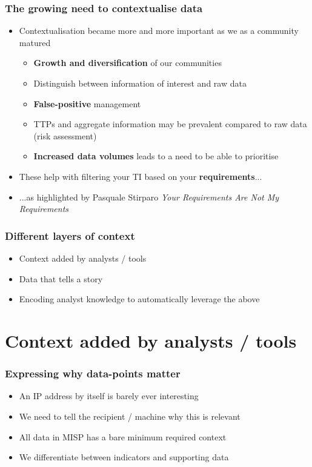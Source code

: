 \begin{frame}
\frametitle{The growing need to contextualise data}
\begin{itemize}
       \item Contextualisation became more and more important as we as a community matured
        \begin{itemize}
                \item {\bf Growth and diversification} of our communities
                \item Distinguish between information of interest and raw data
                \item {\bf False-positive} management
                \item TTPs and aggregate information may be prevalent compared to raw data (risk assessment)
                \item {\bf Increased data volumes} leads to a need to be able to prioritise
	\end{itemize}
	\item These help with filtering your TI based on your {\bf requirements}...
	\item ...as highlighted by Pasquale Stirparo \textit{Your Requirements Are Not My Requirements}
\end{itemize}
\end{frame}

\begin{frame}
\frametitle{Different layers of context}
\begin{itemize}
       \item Context added by analysts / tools
       \item Data that tells a story
       \item Encoding analyst knowledge to automatically leverage the above
\end{itemize}
\end{frame}

\section{Context added by analysts / tools}

\begin{frame}
\frametitle{Expressing why data-points matter}
\begin{itemize}
       \item An IP address by itself is barely ever interesting
       \item We need to tell the recipient / machine why this is relevant
       \item All data in MISP has a bare minimum required context
       \item We differentiate between indicators and supporting data
\end{itemize}
\end{frame}

